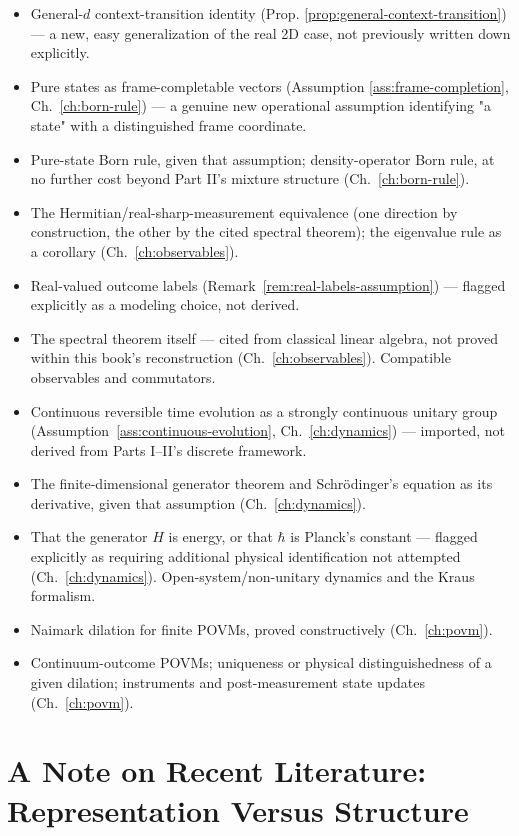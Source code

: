 \begin{itemize}
\item[{[D]}] General-$d$ context-transition identity (Prop.
\ref{prop:general-context-transition}) — a new, easy generalization of the
real 2D case, not previously written down explicitly.
\item[{[A]}] Pure states as frame-completable vectors (Assumption
\ref{ass:frame-completion}, Ch.~\ref{ch:born-rule}) — a genuine new
operational assumption identifying "a state" with a distinguished frame
coordinate.
\item[{[D]}] Pure-state Born rule, given that assumption; density-operator
Born rule, at no further cost beyond Part II's mixture structure
(Ch.~\ref{ch:born-rule}).
\item[{[D]}] The Hermitian/real-sharp-measurement equivalence (one direction
by construction, the other by the cited spectral theorem); the eigenvalue
rule as a corollary (Ch.~\ref{ch:observables}).
\item[{[A]}] Real-valued outcome labels (Remark~\ref{rem:real-labels-assumption})
— flagged explicitly as a modeling choice, not derived.
\item[{[U]}] The spectral theorem itself — cited from classical linear
algebra, not proved within this book's reconstruction
(Ch.~\ref{ch:observables}). Compatible observables and commutators.
\item[{[A]}] Continuous reversible time evolution as a strongly continuous
unitary group (Assumption~\ref{ass:continuous-evolution},
Ch.~\ref{ch:dynamics}) — imported, not derived from Parts I--II's discrete
framework.
\item[{[D]}] The finite-dimensional generator theorem and Schr\"odinger's
equation as its derivative, given that assumption (Ch.~\ref{ch:dynamics}).
\item[{[U]}] That the generator $H$ is energy, or that $\hbar$ is Planck's
constant — flagged explicitly as requiring additional physical
identification not attempted (Ch.~\ref{ch:dynamics}). Open-system/non-unitary
dynamics and the Kraus formalism.
\item[{[D]}] Naimark dilation for finite POVMs, proved constructively
(Ch.~\ref{ch:povm}).
\item[{[U]}] Continuum-outcome POVMs; uniqueness or physical distinguishedness
of a given dilation; instruments and post-measurement state updates
(Ch.~\ref{ch:povm}).
\end{itemize}

\section{A Note on Recent Literature: Representation Versus Structure}
\label{sec:recent-literature}

